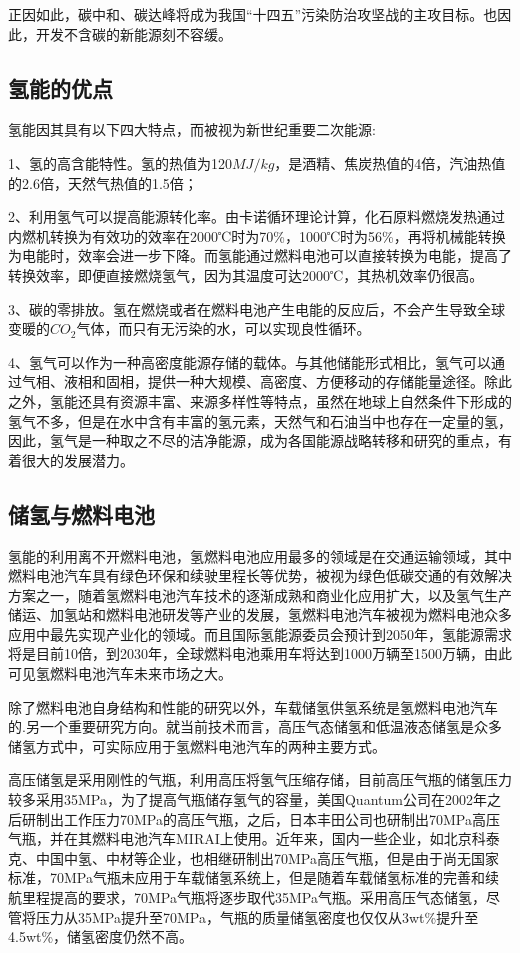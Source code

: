 \documentclass[UTF8,a4paper]{ctexart}
\begin{document}
	正因如此，碳中和、碳达峰将成为我国“十四五”污染防治攻坚战的主攻目标。也因此，开发不含碳的新能源刻不容缓。
	\subsection{氢能的优点}
	氢能因其具有以下四大特点，而被视为新世纪重要二次能源:
	
	1、氢的高含能特性。氢的热值为120$MJ/kg$，是酒精、焦炭热值的4倍，汽油热值的2.6倍，天然气热值的1.5倍；
	
	2、利用氢气可以提高能源转化率。由卡诺循环理论计算，化石原料燃烧发热通过内燃机转换为有效功的效率在2000℃时为70\%，1000℃时为56\%，再将机械能转换为电能时，效率会进一步下降。而氢能通过燃料电池可以直接转换为电能，提高了转换效率，即便直接燃烧氢气，因为其温度可达2000℃，其热机效率仍很高。
	
	3、碳的零排放。氢在燃烧或者在燃料电池产生电能的反应后，不会产生导致全球变暖的$CO_{2}$气体，而只有无污染的水，可以实现良性循环。
	
	4、氢气可以作为一种高密度能源存储的载体。与其他储能形式相比，氢气可以通过气相、液相和固相，提供一种大规模、高密度、方便移动的存储能量途径。除此之外，氢能还具有资源丰富、来源多样性等特点，虽然在地球上自然条件下形成的氢气不多，但是在水中含有丰富的氢元素，天然气和石油当中也存在一定量的氢，因此，氢气是一种取之不尽的洁净能源，成为各国能源战略转移和研究的重点，有着很大的发展潜力。
	\subsection{储氢与燃料电池}
	氢能的利用离不开燃料电池，氢燃料电池应用最多的领域是在交通运输领域，其中燃料电池汽车具有绿色环保和续驶里程长等优势，被视为绿色低碳交通的有效解决方案之一，随着氢燃料电池汽车技术的逐渐成熟和商业化应用扩大，以及氢气生产储运、加氢站和燃料电池研发等产业的发展，氢燃料电池汽车被视为燃料电池众多应用中最先实现产业化的领域。而且国际氢能源委员会预计到2050年，氢能源需求将是目前10倍，到2030年，全球燃料电池乘用车将达到1000万辆至1500万辆，由此可见氢燃料电池汽车未来市场之大。
	
	除了燃料电池自身结构和性能的研究以外，车载储氢供氢系统是氢燃料电池汽车的.另一个重要研究方向。就当前技术而言，高压气态储氢和低温液态储氢是众多储氢方式中，可实际应用于氢燃料电池汽车的两种主要方式。
	
	高压储氢是采用刚性的气瓶，利用高压将氢气压缩存储，目前高压气瓶的储氢压力较多采用35MPa，为了提高气瓶储存氢气的容量，美国Quantum公司在2002年之后研制出工作压力70MPa的高压气瓶，之后，日本丰田公司也研制出70MPa高压气瓶，并在其燃料电池汽车MIRAI上使用。近年来，国内一些企业，如北京科泰克、中国中氢、中材等企业，也相继研制出70MPa高压气瓶，但是由于尚无国家标准，70MPa气瓶未应用于车载储氢系统上，但是随着车载储氢标准的完善和续航里程提高的要求，70MPa气瓶将逐步取代35MPa气瓶。采用高压气态储氢，尽管将压力从35MPa提升至70MPa，气瓶的质量储氢密度也仅仅从3wt\%提升至4.5wt\%，储氢密度仍然不高。
	
\end{document}
